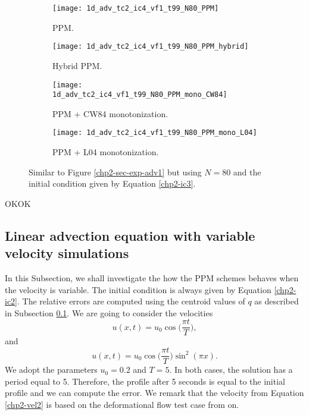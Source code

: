 \begin{figure}[!htb]
  \centering
  \begin{subfigure}{0.49\textwidth}
    \centering
			\texttt{[image: 1d\_adv\_tc2\_ic4\_vf1\_t99\_N80\_PPM]}
			\caption{PPM.\label{chp2-sec-exp-adv3-a}}
  \end{subfigure}
  \begin{subfigure}{0.49\textwidth}
    \centering
			\texttt{[image: 1d\_adv\_tc2\_ic4\_vf1\_t99\_N80\_PPM\_hybrid]}
			\caption{Hybrid PPM.\label{chp2-sec-exp-adv3-b}}
  \end{subfigure}

  \begin{subfigure}{0.49\textwidth}
    \centering
		\texttt{[image: 1d\_adv\_tc2\_ic4\_vf1\_t99\_N80\_PPM\_mono\_CW84]}
    \caption{PPM + CW84 monotonization.\label{chp2-sec-exp-adv3-c}}
  \end{subfigure}
  \begin{subfigure}{0.49\textwidth}
    \centering
			\texttt{[image: 1d\_adv\_tc2\_ic4\_vf1\_t99\_N80\_PPM\_mono\_L04]}
      \caption{PPM + L04 monotonization.\label{chp2-sec-exp-adv3-d}}
  \end{subfigure} 
	\caption{ Similar to Figure \ref{chp2-sec-exp-adv1} but using $N=80$
	and the initial condition given by Equation \eqref{chp2-ic3}.\label{chp2-sec-exp-adv3}}
\end{figure}
OKOK

\newpage

\subsection{Linear advection equation with variable velocity simulations}
\label{chp2-sec-numerical-exp-2}

In this Subsection, we shall investigate the how the PPM schemes behaves when the velocity is variable.
The initial condition is always given by Equation \eqref{chp2-ic2}.
The relative errors are computed using the centroid values of $q$ as described in
Subsection \ref{chp2-sec-numerical-exp-2}. We are going to consider the velocities
\begin{equation}
	\label{chp2-vel1}
	u(x,t) = u_0\cos{\bigg(\frac{\pi t}{T}\bigg)},
\end{equation}
and
\begin{equation}
	\label{chp2-vel2}
	u(x,t) = u_0\cos{\bigg(\frac{\pi t}{T}\bigg)}\sin^2(\pi x).
\end{equation}
We adopt the parameters $u_0 = 0.2$ and $T = 5$.
In both cases, the solution has a period equal to 5.
Therefore, the profile after 5 seconds is equal to the initial profile and we can compute the error.
We remark that the velocity from Equation \eqref{chp2-vel2} is based on the deformational flow 
test case from on\citet{nair:2010}.

